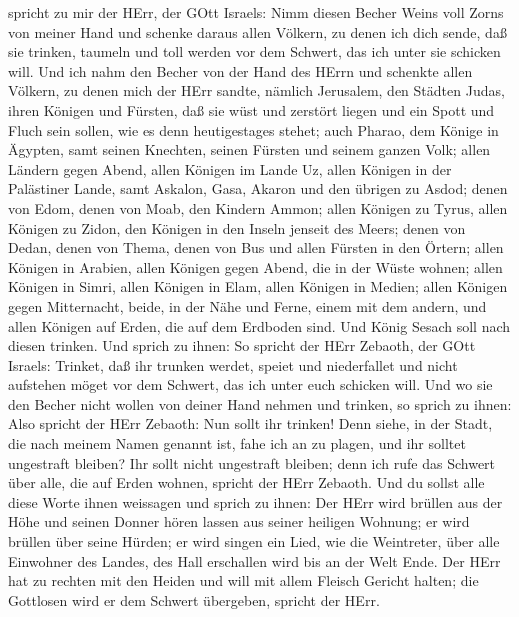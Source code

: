 spricht zu mir der HErr, der GOtt Israels: Nimm diesen Becher Weins voll
Zorns von meiner Hand und schenke daraus allen Völkern, zu denen ich
dich sende,  daß sie trinken, taumeln und toll werden vor
dem Schwert, das ich unter sie schicken will.  Und ich nahm
den Becher von der Hand des HErrn und schenkte allen Völkern, zu denen
mich der HErr sandte,  nämlich Jerusalem, den Städten
Judas, ihren Königen und Fürsten, daß sie wüst und zerstört liegen und
ein Spott und Fluch sein sollen, wie es denn heutigestages stehet;
 auch Pharao, dem Könige in Ägypten, samt seinen Knechten,
seinen Fürsten und seinem ganzen Volk;  allen Ländern gegen
Abend, allen Königen im Lande Uz, allen Königen in der Palästiner Lande,
samt Askalon, Gasa, Akaron und den übrigen zu Asdod;  denen
von Edom, denen von Moab, den Kindern Ammon;  allen Königen
zu Tyrus, allen Königen zu Zidon, den Königen in den Inseln jenseit des
Meers;  denen von Dedan, denen von Thema, denen von Bus und
allen Fürsten in den Örtern;  allen Königen in Arabien,
allen Königen gegen Abend, die in der Wüste wohnen;  allen
Königen in Simri, allen Königen in Elam, allen Königen in Medien;
 allen Königen gegen Mitternacht, beide, in der Nähe und
Ferne, einem mit dem andern, und allen Königen auf Erden, die auf dem
Erdboden sind. Und König Sesach soll nach diesen trinken. 
Und sprich zu ihnen: So spricht der HErr Zebaoth, der GOtt Israels:
Trinket, daß ihr trunken werdet, speiet und niederfallet und nicht
aufstehen möget vor dem Schwert, das ich unter euch schicken will.
 Und wo sie den Becher nicht wollen von deiner Hand nehmen
und trinken, so sprich zu ihnen: Also spricht der HErr Zebaoth: Nun
sollt ihr trinken!  Denn siehe, in der Stadt, die nach
meinem Namen genannt ist, fahe ich an zu plagen, und ihr solltet
ungestraft bleiben? Ihr sollt nicht ungestraft bleiben; denn ich rufe
das Schwert über alle, die auf Erden wohnen, spricht der HErr Zebaoth.
 Und du sollst alle diese Worte ihnen weissagen und sprich
zu ihnen: Der HErr wird brüllen aus der Höhe und seinen Donner hören
lassen aus seiner heiligen Wohnung; er wird brüllen über seine Hürden;
er wird singen ein Lied, wie die Weintreter, über alle Einwohner des
Landes, des Hall erschallen wird bis an der Welt Ende.  Der
HErr hat zu rechten mit den Heiden und will mit allem Fleisch Gericht
halten; die Gottlosen wird er dem Schwert übergeben, spricht der HErr.
